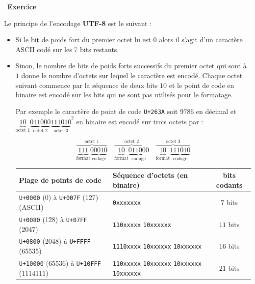 \documentclass[a4paper, french, 12pt]{article}  %
\newcounter{exo}
\newenvironment{exercice}[1]
{\par \medskip   \addtocounter{exo}{1} \noindent  
\begin{bclogo}[arrondi =0.1,   noborder = true, logo=\bccrayon, marge=4]{~\textbf{Exercice} \textbf{\theexo} {\itshape #1} }  \par}
{
\end{bclogo}
 \par \bigskip }
\begin{document}
\vspace*{-20pt}

\begin{exercice}{}

Le principe de l'encodage \textbf{UTF-8} est le suivant :

\begin{itemize}
	\item Si le bit de poids fort du premier octet lu est $0$ alors il s'agit d'un caractère ASCII codé sur les 7 bits restants. 
	\item Sinon, le nombre de bits de poids forts successifs du premier octet qui sont à $1$ donne le nombre d'octets sur lequel le caractère est encodé. Chaque octet suivant commence par la séquence de deux bits $10$ et le point de code en binaire est encodé sur les bits qui ne sont pas utilisés pour le formatage. 
	
Par exemple le caractère de point de code \texttt{U+263A} soit $9786$ en décimal et $\overline{\underbrace{10}_{\text{octet }1}\underbrace{011000}_{\text{octet }2}\underbrace{111010}_{\text{octet }3}}^{2}$ en binaire est encodé sur trois octets par :

\begin{equation*}
\overbrace{\underbrace{111}_{\text{format}}\underbrace{00010}_{\text{codage}}}^{\text{octet 1}}   \quad  \overbrace{\underbrace{10}_{\text{format}}\underbrace{011000}_{\text{codage}}}^{\text{octet 2}}  \quad   \overbrace{\underbrace{10}_{\text{format}}\underbrace{111010}_{\text{codage}}}^{\text{octet 3}}
\end{equation*}


\begin{tabular}{|l|l|c|}
\hline 
Plage de points de code & Séquence d'octets (en binaire)  & bits codants \\ 
\hline 
\texttt{U+0000} (0) à \texttt{U+007F} (127) (ASCII) & \texttt{0xxxxxxx} & $7$ bits \\ 
\hline 
\texttt{U+0080} (128) à \texttt{U+07FF} (2047)  & \texttt{110xxxxx} \texttt{10xxxxxx} & $11$ bits \\ 
\hline 
\texttt{U+0800} (2048) à \texttt{U+FFFF} (65535) & \texttt{1110xxxx} \texttt{10xxxxxx} \texttt{10xxxxxx} & $16$ bits \\ 
\hline 
\texttt{U+10000} (65536) à \texttt{U+10FFF} (1114111)  & \texttt{110xxxxx} \texttt{10xxxxxx}  \texttt{10xxxxxx} \texttt{10xxxxxx}  & $21$ bits \\ 
\hline 
\end{tabular} 
\end{itemize}


\end{exercice}
\end{document}
